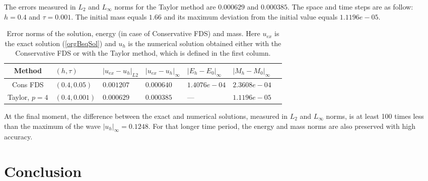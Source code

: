 \documentclass[%
 aip,
cp,  
 amsmath,amssymb,
 reprint,
]{iopconfser}
\newcommand{\rf}[1]{(\ref{#1})}
\begin{document}
The errors measured in $L_2$ and $L_\infty$ norms for the Taylor method are $0.000629$ and $0.000385$. The space and time steps are as follow: $h = 0.4$ and  $\tau = 0.001$. The initial mass equals $1.66$ and its maximum deviation from the initial value equals $1.1196e-05$.



\begin{table}[ht]
\centering
\small
		\begin{tabular}{|c|l|l|l|l|l|l|}
			\hline
Method                    & $(h, \tau)$   &    $|u_{ex}-u_{h}|_{L2}$  &    $|u_{ex}-u_{h}|_{\infty}$  &   $|E_{h}-E_0|_{\infty}$ &   $|M_{h}-M_0|_{\infty}$       \\
			\hline
           Cons FDS          &  $(0.4,0.05)$  &  $ 0.001207$       &     $0.000640$               &     $1.4076e-04$           &               $2.3608e-04$     \\
			\hline
           Taylor, $p=4$       & $(0.4,0.001)$  &  $0.000629$     &      $0.000385$               &            ---           &               $1.1196e-05$     \\
			\hline
  		\end{tabular}
	\caption{Error norms of the solution, energy (in case of Conservative FDS) and mass. Here $u_{ex}$ is the exact solution \rf{orgBsqSol} and $u_{h}$ is the numerical solution obtained either with the Conservative FDS or with the Taylor method, which is defined in the first column.}
	\label{final35}
\end{table}

At the final moment, the difference between the exact and numerical solutions, measured in $L_2$ and $L_\infty$ norms, is at least 100 times less than the maximum of the wave $|u_h|_\infty = 0.1248$. For that longer time period, the energy and mass norms are also preserved with high accuracy.

\section{Conclusion}
\end{document}
